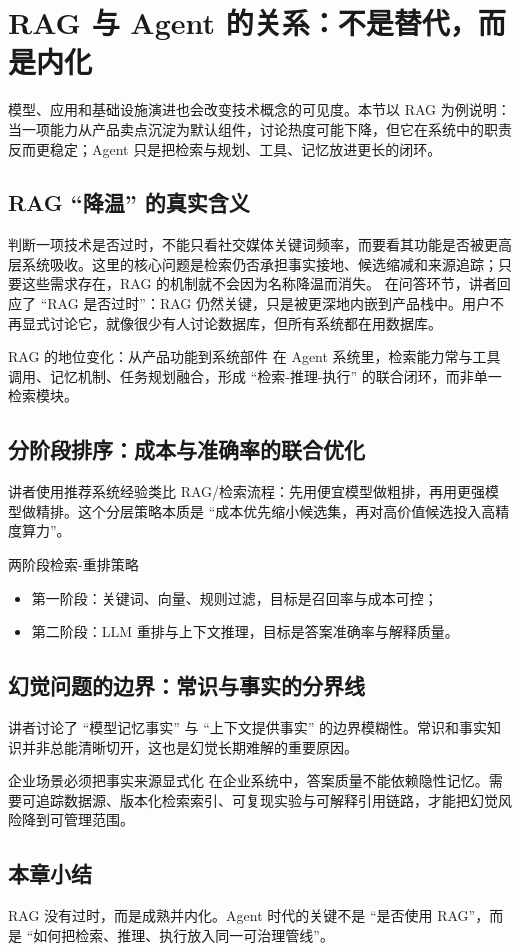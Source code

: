 \section{RAG 与 Agent 的关系：不是替代，而是内化}

模型、应用和基础设施演进也会改变技术概念的可见度。本节以 RAG 为例说明：当一项能力从产品卖点沉淀为默认组件，讨论热度可能下降，但它在系统中的职责反而更稳定；Agent 只是把检索与规划、工具、记忆放进更长的闭环。

\subsection{RAG ``降温'' 的真实含义}
判断一项技术是否过时，不能只看社交媒体关键词频率，而要看其功能是否被更高层系统吸收。这里的核心问题是检索仍否承担事实接地、候选缩减和来源追踪；只要这些需求存在，RAG 的机制就不会因为名称降温而消失。
在问答环节，讲者回应了 ``RAG 是否过时''：RAG 仍然关键，只是被更深地内嵌到产品栈中。用户不再显式讨论它，就像很少有人讨论数据库，但所有系统都在用数据库。

\begin{importantbox}{RAG 的地位变化：从产品功能到系统部件}
在 Agent 系统里，检索能力常与工具调用、记忆机制、任务规划融合，形成 ``检索-推理-执行'' 的联合闭环，而非单一检索模块。
\end{importantbox}

\subsection{分阶段排序：成本与准确率的联合优化}
讲者使用推荐系统经验类比 RAG/检索流程：先用便宜模型做粗排，再用更强模型做精排。这个分层策略本质是 ``成本优先缩小候选集，再对高价值候选投入高精度算力''。

\begin{knowledgebox}{两阶段检索-重排策略}
\begin{itemize}
    \item 第一阶段：关键词、向量、规则过滤，目标是召回率与成本可控；
    \item 第二阶段：LLM 重排与上下文推理，目标是答案准确率与解释质量。
\end{itemize}
\end{knowledgebox}

\subsection{幻觉问题的边界：常识与事实的分界线}
讲者讨论了 ``模型记忆事实'' 与 ``上下文提供事实'' 的边界模糊性。常识和事实知识并非总能清晰切开，这也是幻觉长期难解的重要原因。

\begin{warningbox}{企业场景必须把事实来源显式化}
在企业系统中，答案质量不能依赖隐性记忆。需要可追踪数据源、版本化检索索引、可复现实验与可解释引用链路，才能把幻觉风险降到可管理范围。
\end{warningbox}

\subsection{本章小结}
RAG 没有过时，而是成熟并内化。Agent 时代的关键不是 ``是否使用 RAG''，而是 ``如何把检索、推理、执行放入同一可治理管线''。

